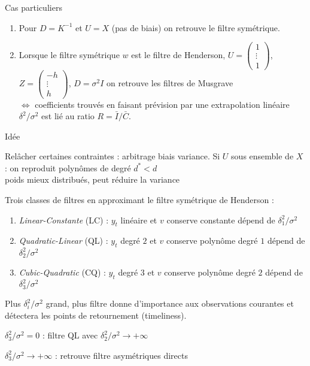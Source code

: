 \documentclass[10pt,xcolor=table,color={dvipsnames,usenames},ignorenonframetext,usepdftitle=false,french]{beamer}
\begin{document}
\begin{frame}{Cas particuliers}
\protect\hypertarget{cas-particuliers}{}

\begin{enumerate}
\item
  Pour \(D=K^{-1}\) et \(U=X\) (pas de biais) on retrouve le filtre
  symétrique.
\item
  Lorsque le filtre symétrique \(w\) est le filtre de Henderson,
  \(U=\begin{pmatrix}1 \\ \vdots\\ 1\end{pmatrix}\),
  \(Z=\begin{pmatrix}-h \\ \vdots\\ h\end{pmatrix}\), \(D=\sigma^2 I\)
  on retrouve les filtres de Musgrave\\
  \(\iff\) coefficients trouvés en faisant prévision par une
  extrapolation linéaire\\
  \(\delta^{2}/\sigma^{2}\) est lié au ratio \(R=\bar{I}/\bar{C}\).
\end{enumerate}

\end{frame}

\begin{frame}{Idée \bclampe}
\protect\hypertarget{iduxe9e}{}

Relâcher certaines contraintes : arbitrage biais variance. Si \(U\) sous
ensemble de \(X\) : on reproduit polynômes de degré \(d^*<d\)\\
\faArrowCircleRight{} poids mieux distribués, peut réduire la variance
\pause

Trois classes de filtres en approximant le filtre symétrique de
Henderson :

\begin{enumerate}
\item
  \emph{Linear-Constante} (LC) : \(y_t\) linéaire et \(v\) conserve
  constante \faArrowCircleRight{} dépend de \(\delta_1^2/\sigma^2\)
\item
  \emph{Quadratic-Linear} (QL) : \(y_t\) degré \(2\) et \(v\) conserve
  polynôme degré \(1\) \faArrowCircleRight{} dépend de
  \(\delta_2^2/\sigma^2\)
\item
  \emph{Cubic-Quadratic} (CQ) : \(y_t\) degré \(3\) et \(v\) conserve
  polynôme degré \(2\) \faArrowCircleRight{} dépend de
  \(\delta_3^2/\sigma^2\)
\end{enumerate}

\pause

Plus \(\delta_i^2/\sigma^2\) grand, plus filtre donne d'importance aux
observations courantes et détectera les points de retournement
(timeliness).

\(\delta_3^2/\sigma^2=0\) : filtre QL avec
\(\delta_2^2/\sigma^2\to+\infty\)

\(\delta_3^2/\sigma^2\to+\infty\) : retrouve filtre asymétriques directs

\end{frame}
\end{document}
